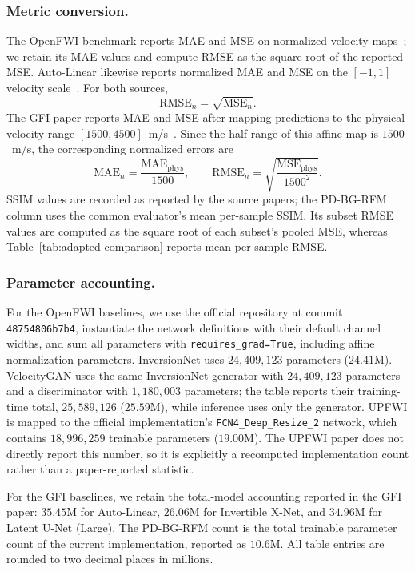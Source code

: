 \documentclass[letterpaper]{article}
\begin{document}
\subsubsection{Metric conversion.}
The OpenFWI benchmark reports MAE and MSE on normalized velocity maps~\cite{deng2022openfwi}; we retain its MAE values and compute RMSE as the square root of the reported MSE. Auto-Linear likewise reports normalized MAE and MSE on the $[-1,1]$ velocity scale~\cite{feng2024autolinear}. For both sources,
\begin{equation}
\mathrm{RMSE}_{n}=\sqrt{\mathrm{MSE}_{n}}.
\end{equation}
The GFI paper reports MAE and MSE after mapping predictions to the physical velocity range $[1500,4500]$~m/s~\cite{gupta2025gfi}. Since the half-range of this affine map is $1500$~m/s, the corresponding normalized errors are
\begin{equation}
\mathrm{MAE}_{n}=\frac{\mathrm{MAE}_{\mathrm{phys}}}{1500},
\qquad
\mathrm{RMSE}_{n}=\sqrt{\frac{\mathrm{MSE}_{\mathrm{phys}}}{1500^2}}.
\end{equation}
SSIM values are recorded as reported by the source papers; the PD-BG-RFM column uses the common evaluator's mean per-sample SSIM. Its subset RMSE values are computed as the square root of each subset's pooled MSE, whereas Table~\ref{tab:adapted-comparison} reports mean per-sample RMSE.

\subsubsection{Parameter accounting.}
For the OpenFWI baselines, we use the official repository at commit \texttt{48754806b7b4}, instantiate the network definitions with their default channel widths, and sum all parameters with \texttt{requires\_grad=True}, including affine normalization parameters. InversionNet uses $24{,}409{,}123$ parameters ($24.41$M). VelocityGAN uses the same InversionNet generator with $24{,}409{,}123$ parameters and a discriminator with $1{,}180{,}003$ parameters; the table reports their training-time total, $25{,}589{,}126$ ($25.59$M), while inference uses only the generator. UPFWI is mapped to the official implementation's \texttt{FCN4\_Deep\_Resize\_2} network, which contains $18{,}996{,}259$ trainable parameters ($19.00$M). The UPFWI paper does not directly report this number, so it is explicitly a recomputed implementation count rather than a paper-reported statistic.

For the GFI baselines, we retain the total-model accounting reported in the GFI paper: $35.45$M for Auto-Linear, $26.06$M for Invertible X-Net, and $34.96$M for Latent U-Net (Large). The PD-BG-RFM count is the total trainable parameter count of the current implementation, reported as $10.6$M. All table entries are rounded to two decimal places in millions.
\end{document}
